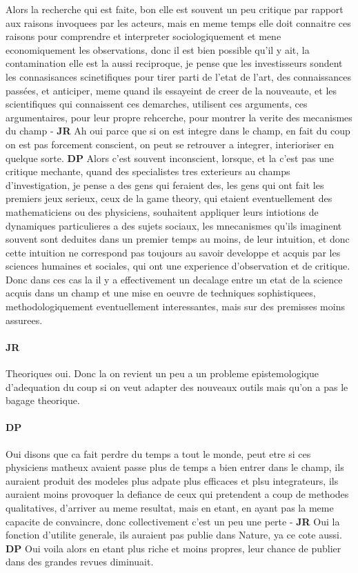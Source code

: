 \documentclass[12pt]{article}
\begin{document}
Alors la recherche qui est faite, bon elle est souvent un peu critique par rapport aux raisons invoquees par les acteurs, mais en meme temps elle doit connaitre ces raisons pour comprendre et interpreter sociologiquement et mene economiquement les observations, donc il est bien possible qu'il y ait, la contamination elle est la aussi reciproque, je pense que les investisseurs sondent les connasisances scinetifiques pour tirer parti de l'etat de l'art, des connaissances passées, et anticiper, meme quand ils essayeint de creer de la nouveaute, et les scientifiques qui connaissent ces demarches, utilisent ces arguments, ces argumentaires, pour leur propre rehcerche, pour montrer la verite des mecanismes du champ - \textbf{JR} Ah oui parce que si on est integre dans le champ, en fait du coup on est pas forcement conscient, on peut se retrouver a integrer, interioriser en quelque sorte. \textbf{DP} Alors c'est souvent inconscient, lorsque, et la c'est pas une critique mechante, quand des specialistes tres exterieurs au champs d'investigation, je pense a des gens qui feraient des, les gens qui ont fait les premiers jeux serieux, ceux de la game theory, qui etaient eventuellement des mathematiciens ou des physiciens, souhaitent appliquer leurs intiotions de dynamiques particulieres a des sujets sociaux, les mnecanismes qu'ils imaginent souvent sont deduites dans un premier temps au moins, de leur intuition, et donc cette intuition ne correspond pas toujours au savoir developpe et acquis par les sciences humaines et sociales, qui ont une experience d'observation et de critique. Donc dans ces cas la il y a  effectivement un decalage entre un etat de la science acquis dans un champ et une mise en oeuvre de techniques sophistiquees, methodologiquement eventuellement interessantes, mais sur des premisses moins assurees. 

\paragraph{JR}

Theoriques oui. Donc la on revient un peu a un probleme epistemologique d'adequation du coup si on veut adapter des nouveaux outils mais qu'on a pas le bagage theorique.

\paragraph{DP}

Oui disons que ca fait perdre du temps a tout le monde, peut etre si ces physiciens matheux avaient passe plus de temps a bien entrer dans le champ, ils auraient produit des modeles plus adpate plus efficaces et plsu integrateurs, ils auraient moins provoquer la defiance de ceux qui pretendent a coup de methodes qualitatives, d'arriver au meme resultat, mais en etant, en ayant pas la meme capacite de convaincre, donc collectivement c'est un peu une perte - \textbf{JR} Oui la fonction d'utilite generale, ils auraient pas publie dans Nature, ya ce cote aussi. \textbf{DP} Oui voila alors en etant plus riche et moins propres, leur chance de publier dans des grandes revues diminuait. 
\end{document}
